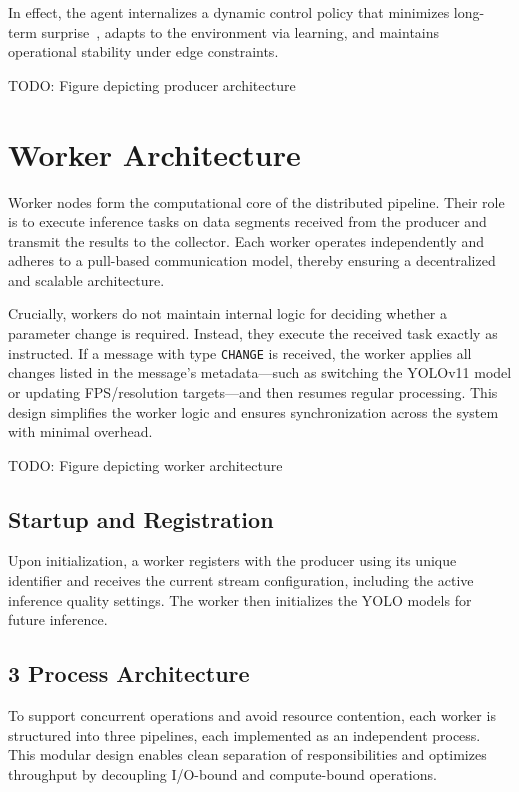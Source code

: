 In effect, the agent internalizes a dynamic control policy that minimizes long-term surprise~\cite{sedlak_adaptive_2024}, adapts to the environment via learning, and maintains operational stability under edge constraints.

TODO: Figure depicting producer architecture

\section{Worker Architecture}
\label{sec:evaluation-implementation-worker-architecture}
Worker nodes form the computational core of the distributed pipeline. Their role is to execute inference tasks on data segments received from the producer and transmit the results to the collector. Each worker operates independently and adheres to a pull-based communication model, thereby ensuring a decentralized and scalable architecture.

Crucially, workers do not maintain internal logic for deciding whether a parameter change is required. Instead, they execute the received task exactly as instructed. If a message with type \texttt{CHANGE} is received, the worker applies all changes listed in the message's metadata—such as switching the YOLOv11 model or updating FPS/resolution targets—and then resumes regular processing. This design simplifies the worker logic and ensures synchronization across the system with minimal overhead.

TODO: Figure depicting worker architecture

\subsection{Startup and Registration}
Upon initialization, a worker registers with the producer using its unique identifier and receives the current stream configuration, including the active inference quality settings. The worker then initializes the YOLO models for future inference.

\subsection{3 Process Architecture}
To support concurrent operations and avoid resource contention, each worker is structured into three pipelines, each implemented as an independent process. This modular design enables clean separation of responsibilities and optimizes throughput by decoupling I/O-bound and compute-bound operations.

